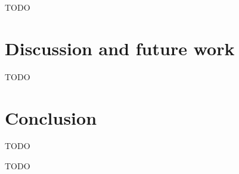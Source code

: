 \documentclass[acmsmall]{acmart}
\begin{document}


TODO %


\section{Discussion and future work} \label{sec:discussion}


TODO %


\section{Conclusion} \label{sec:conclusion}

TODO %


\begin{acks}
    TODO %
\end{acks}



\end{document}
